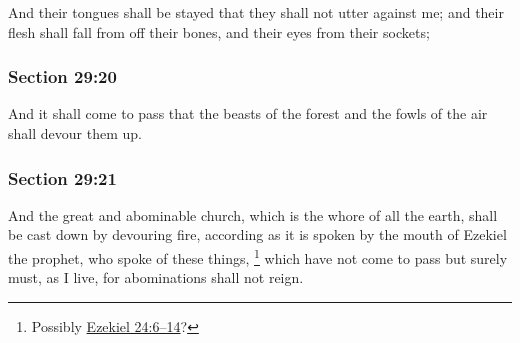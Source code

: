 		And their tongues shall be stayed that they shall not utter against me; and their flesh shall fall from off their bones, and their eyes from their sockets;


	\subsubsection{Section 29:20} %
		\label{DC29-20}

		And it shall come to pass that the beasts of the forest and the fowls of the air shall devour them up.


	\subsubsection{Section 29:21} %
		\label{DC29-21}

		And the great and abominable church, which is the whore of all the earth, shall be cast down by devouring fire, according as it is spoken by the mouth of Ezekiel the prophet, who spoke of these things,%
			\footnote{%
				Possibly \hyperref[EZEKIEL-24-6]{Ezekiel 24:6--14}?
				}
		which have not come to pass but surely must, as I live, for abominations shall not reign.


